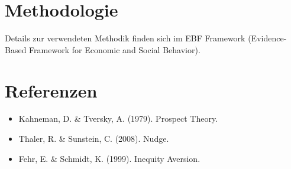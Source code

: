 \documentclass{fehradvice-report}
\begin{document}

\newpage
\appendix
\section{Methodologie}

Details zur verwendeten Methodik finden sich im EBF Framework (Evidence-Based Framework for Economic and Social Behavior).

\section{Referenzen}

\begin{itemize}
    \item Kahneman, D. \& Tversky, A. (1979). Prospect Theory.
    \item Thaler, R. \& Sunstein, C. (2008). Nudge.
    \item Fehr, E. \& Schmidt, K. (1999). Inequity Aversion.
\end{itemize}
\end{document}
